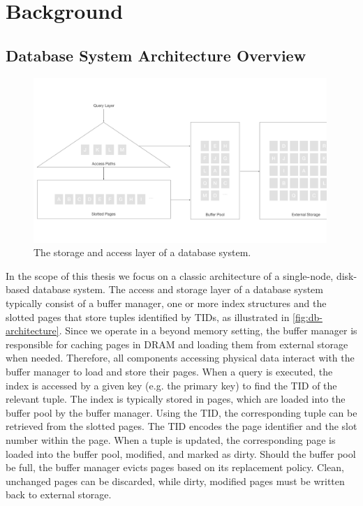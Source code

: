 \chapter{Background}

\section{Database System Architecture Overview}

\begin{figure}[htpb]
  \centering
  \includegraphics[width=0.99\textwidth]{figures/db_architecture.pdf}
  \caption{The storage and access layer of a database system.}
  \label{fig:db-architecture}
\end{figure}

In the scope of this thesis we focus on a classic architecture of a single-node, disk-based database system.
The access and storage layer of a database system typically consist of a buffer manager, one or more index structures and the slotted pages that store tuples identified by \ac{TID}s, as illustrated in \autoref{fig:db-architecture}.
Since we operate in a beyond memory setting, the buffer manager is responsible for caching pages in \ac{DRAM} and loading them from external storage when needed.
Therefore, all components accessing physical data interact with the buffer manager to load and store their pages.
When a query is executed, the index is accessed by a given key (e.g. the primary key) to find the \ac{TID} of the relevant tuple.
The index is typically stored in pages, which are loaded into the buffer pool by the buffer manager.
Using the \ac{TID}, the corresponding tuple can be retrieved from the slotted pages.
The \ac{TID} encodes the page identifier and the slot number within the page.
When a tuple is updated, the corresponding page is loaded into the buffer pool, modified, and marked as dirty.
Should the buffer pool be full, the buffer manager evicts pages based on its replacement policy.
Clean, unchanged pages can be discarded, while dirty, modified pages must be written back to external storage.


